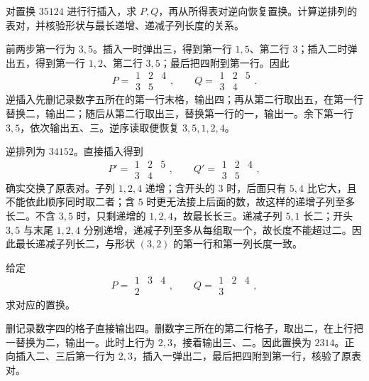 \begin{exercise}\label{b5:ex:A-insert-2413}
	对置换 \(35124\) 进行行插入，求 \(P,Q\)，再从所得表对逆向恢复置换。计算逆排列的表对，并核验形状与最长递增、递减子列长度的关系。
\end{exercise}
\begin{solution}
	前两步第一行为 \(3,5\)。插入一时弹出三，得到第一行 \(1,5\)、第二行 \(3\)；插入二时弹出五，得到第一行 \(1,2\)、第二行 \(3,5\)；最后把四附到第一行。因此
	\[
		P=\begin{array}{ccc}1&2&4\\3&5&\end{array},
		\qquad Q=\begin{array}{ccc}1&2&5\\3&4&\end{array}.
	\]
	逆插入先删记录数字五所在的第一行末格，输出四；再从第二行取出五，在第一行替换二，输出二；随后从第二行取出三，替换第一行的一，输出一。余下第一行 \(3,5\)，依次输出五、三。逆序读取便恢复 \(3,5,1,2,4\)。

	逆排列为 \(34152\)。直接插入得到
	\[
		P'=\begin{array}{ccc}1&2&5\\3&4&\end{array},
		\qquad Q'=\begin{array}{ccc}1&2&4\\3&5&\end{array},
	\]
	确实交换了原表对。子列 \(1,2,4\) 递增；含开头的 \(3\) 时，后面只有 \(5,4\) 比它大，且不能依此顺序同时取二者；含 \(5\) 时更无法接上后面的数，故这样的递增子列至多长二。不含 \(3,5\) 时，只剩递增的 \(1,2,4\)，故最长长三。递减子列 \(5,1\) 长二；开头 \(3,5\) 与末尾 \(1,2,4\) 分别递增，递减子列至多从每组取一个，故长度不能超过二。因此最长递减子列长二，与形状 \((3,2)\) 的第一行和第一列长度一致。
\end{solution}

\begin{exercise}\label{b5:ex:A-inverse-pair}
	给定
	\[
		P=\begin{array}{ccc}1&3&4\\2&&\end{array},
		\qquad
		Q=\begin{array}{ccc}1&2&4\\3&&\end{array},
	\]
	求对应的置换。
\end{exercise}
\begin{solution}
	删记录数字四的格子直接输出四。删数字三所在的第二行格子，取出二，在上行把一替换为二，输出一。此时上行为 \(2,3\)，接着输出三、二。因此置换为 \(2314\)。正向插入二、三后第一行为 \(2,3\)，插入一弹出二，最后把四附到第一行，核验了原表对。
\end{solution}

